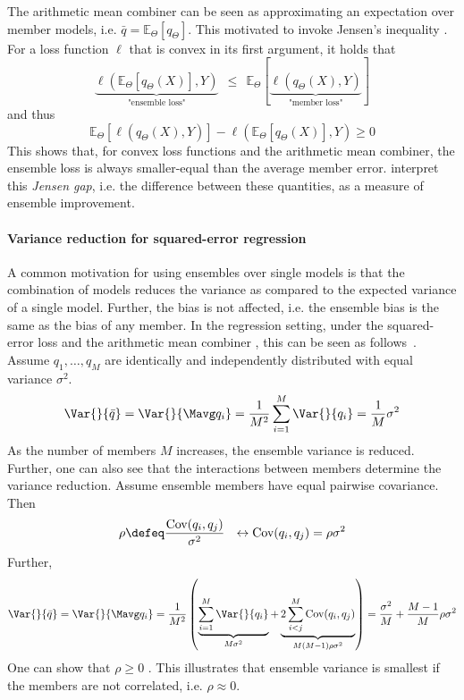 \documentclass[
    a4paper, %
	fontsize=10pt, %
	twoside=false, %
]{kaobook}
\begin{document}
The arithmetic mean combiner can be seen as approximating an expectation over member models, i.e. $\bar{q} = \mathbb{E}_{\Theta} \left[q_{\Theta}\right]$.
This motivated  to invoke Jensen's inequality
. For a loss function $\ell$ that is convex in its first argument, it holds that
$$
\underbrace{
\ell(\mathbb{E}_{\Theta}\left[ q_{\Theta}(X)\right] , Y  ) 
}_{\text{"ensemble loss"}}
~ ~ \leq ~ ~ 
\mathbb{E}_{\Theta}\left[ 
\underbrace{
\ell(q_{\Theta}(X), Y)  
}_{\text{"member loss"}}
\right]
$$
and thus
$$
\mathbb{E}_{{\Theta}}\left[ \ell (q_{\Theta}(X),Y) \right]  -
\ell(\mathbb{E}_{\Theta}\left[ q_{\Theta}(X) \right] ,Y ) \geq 0
$$
This shows that, for convex loss functions and the arithmetic mean combiner, the ensemble loss is always smaller-equal than the average member error.
 interpret this \textit{Jensen gap}, i.e. the difference between these quantities, as a measure of ensemble improvement. 


\paragraph{Variance reduction for squared-error regression} 
A common motivation for using ensembles over single models is that the combination of models reduces the variance as compared to the expected variance of a single model. Further, the bias is not affected, i.e. the ensemble bias is the same as the bias of any member.
In the regression setting, under the squared-error loss and the arithmetic mean combiner%
, this can be seen as follows~\cite{stackexchange}. Assume $q_{1}, \dots, q_{M}$ are identically and independently distributed with equal variance $\sigma^2$.
$$
	\Var{}{\bar{q}} = \Var{}{\Mavg q_{i}} = \frac{1}{M^2} \sum_{i=1}^M \Var{}{q_{i}} = \frac{1}{M} \sigma^2
$$
As the number of members $M$ increases, the ensemble variance is reduced. Further, one can also see that the interactions between members determine the variance reduction. Assume ensemble members have equal pairwise covariance. Then 
$$
\rho \defeq \frac{\text{Cov}(q_{i}, q_{j})}{\sigma^2} ~ ~ \leftrightarrow \text{Cov}(q_{i}, q_{j}) = \rho \sigma^2
$$
Further, 
$$
\Var{}{\bar{q}} = \Var{}{\Mavg q_{i}} = \frac{1}{M^2} \left( 
\underbrace{
\sum_{i=1}^M \Var{}{q_{i}}
}_{M\sigma^2}
+
\underbrace{
2 \sum_{i<j}^M \text{Cov}(q_{i}, q_{j})
}_{M(M-1)\rho \sigma^2}
\right)
= \frac{\sigma^2}{M} + \frac{M-1}{M} \rho \sigma^2
$$
One can show that $\rho \geq 0$ \cite{louppe_UnderstandingRandomForests_2015}. This illustrates that ensemble variance is smallest if the members are not correlated, i.e. $\rho \approx 0$. 
\end{document}
